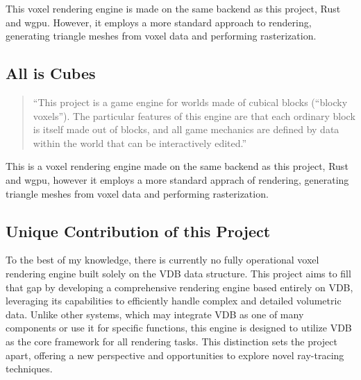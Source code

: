 This voxel rendering engine is made on the same backend as this project, Rust and wgpu. However, it employs a more standard approach to rendering, generating triangle meshes from voxel data and performing rasterization.

\subsection{All is Cubes\supercite{cubes}}

\begin{quote}
``This project is a game engine for worlds made of cubical blocks (“blocky voxels”). The particular features of this engine are that each ordinary block is itself made out of blocks, and all game mechanics are defined by data within the world that can be interactively edited.''
\end{quote}

This is a voxel rendering engine made on the same backend as this project, Rust and wgpu, however it employs a more standard apprach of rendering, generating triangle meshes from voxel data and performing rasterization.

\subsection{ Unique Contribution of this Project}
To the best of my knowledge, there is currently no fully operational voxel rendering engine built solely on the VDB data structure. This project aims to fill that gap by developing a comprehensive rendering engine based entirely on VDB, leveraging its capabilities to efficiently handle complex and detailed volumetric data. Unlike other systems, which may integrate VDB as one of many components or use it for specific functions, this engine is designed to utilize VDB as the core framework for all rendering tasks. This distinction sets the project apart, offering a new perspective and opportunities to explore novel ray-tracing techniques.
